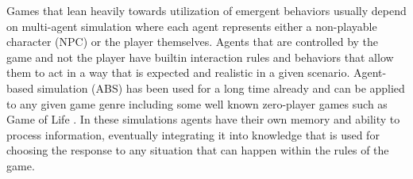 Games that lean heavily towards utilization of emergent behaviors usually depend on multi-agent simulation where each agent represents either a non-playable character (NPC) or the player themselves.
Agents that are controlled by the game and not the player have builtin interaction rules and behaviors that allow them to act in a way that is expected and realistic in a given scenario.
Agent-based simulation (ABS) has been used for a long time already and can be applied to any given game genre including some well known zero-player games such as Game of Life \cite{chan2010simulation}.
In these simulations agents have their own memory and ability to process information, eventually integrating it into knowledge that is used for choosing the response to any situation that can happen within the rules of the game.


